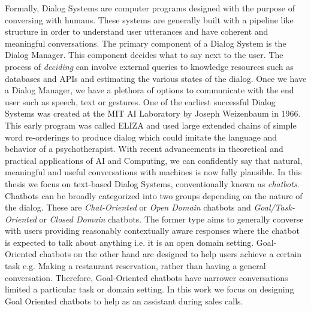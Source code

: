 \documentclass[12pt]{extarticle}
\numberwithin{equation}{section}
\begin{document}
	Formally, Dialog Systems are computer programs designed with the purpose of conversing with humans. These systems are generally built with a pipeline like structure in order to understand user utterances and have coherent and meaningful conversations. The primary component of a Dialog System is the Dialog Manager. This component decides what to say next to the user. The process of \textit{deciding} can involve external queries to knowledge resources such as databases and APIs and estimating the various states of the dialog. Once we have a Dialog Manager, we have a plethora of options to communicate with the end user such as speech, text or gestures.
	One of the earliest successful Dialog Systems was created at the MIT AI Laboratory by Joseph Weizenbaum in 1966. This early program was called ELIZA \cite{Weizenbaum:1966:ECP:365153.365168} and used large extended chains of simple word re-orderings to produce dialog which could imitate the language and behavior of a psychotherapist. With recent advancements in theoretical and practical applications of AI and Computing, we can confidently say that natural, meaningful and useful conversations with machines is now fully plausible. In this thesis we focus on text-based Dialog Systems, conventionally known as \textit{chatbots}. Chatbots can be broadly categorized into two groups depending on the nature of the dialog. These are \textit{Chat-Oriented} or \textit{Open Domain} chatbots and \textit{Goal/Task-Oriented} or \textit{Closed Domain} chatbots. The former type aims to generally converse with users providing reasonably contextually aware responses where the chatbot is expected to talk about anything i.e. it is an open domain setting. Goal-Oriented chatbots on the other hand are designed to help users achieve a certain task e.g. Making a restaurant reservation, rather than having a general conversation. Therefore, Goal-Oriented chatbots have narrower conversations limited a particular task or domain setting. In this work we focus on designing Goal Oriented chatbots to help as an assistant during sales calls.
\end{document}
